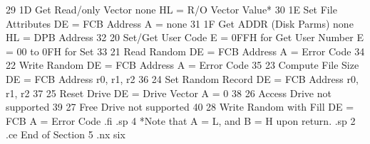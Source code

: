 29          1D   Get Read/only Vector    none                   HL = R/O
                                                                 Vector Value*
30          1E   Set File Attributes     DE = FCB Address       A = none
31          1F   Get ADDR (Disk Parms)   none                   HL = DPB
                                                                 Address
32          20   Set/Get User Code       E = 0FFH for Get       User Number
                                         E = 00 to 0FH for Set
33          21   Read Random             DE = FCB Address       A = Error Code
34          22   Write Random            DE = FCB Address       A = Error Code
35          23   Compute File Size       DE = FCB Address       r0, r1, r2
36          24   Set Random Record       DE = FCB Address       r0, r1, r2
37          25   Reset Drive             DE = Drive Vector      A = 0
38          26   Access Drive            not supported
39          27   Free Drive              not supported
40          28   Write Random with Fill  DE = FCB               A = Error Code
.fi
.sp 4
*Note that A = L, and B = H upon return.
.sp 2
.ce
End of Section 5
.nx six
